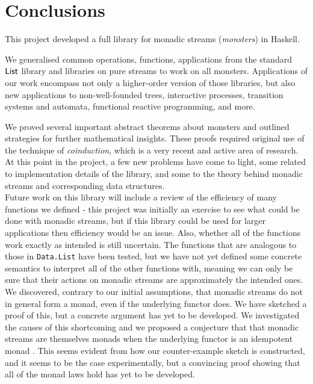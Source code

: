 \section{Conclusions}

This project developed a full library for monadic streams ({\em monsters}) in Haskell.

We generalised common operations, functions, applications from the standard $\mathsf{List}$ library and libraries on pure streams to work on all monsters.
Applications of our work encompass not only a higher-order version of those libraries, but also new applications to non-well-founded trees, interactive processes, transition systems and automata, functional reactive programming, and more.

We proved several important abstract theorems about monsters and outlined strategies for further mathematical insights.
These proofs required original use of the technique of {\em coinduction}, which is a very recent and active area of research. \\

At this point in the project, a few new problems have come to light, some related to implementation details of the library, and some to the theory behind monadic streams and corresponding data structures. \\

Future work on this library will include a review of the efficiency of many functions we defined - this project was initially an exercise to see what could be done with monadic streams, but if this library could be used for larger applications then efficiency would be an issue. Also, whether all of the functions work exactly as intended is still uncertain. The functions that are analogous to those in \verb+Data.List+ have been tested, but we have not yet defined some concrete semantics to interpret all of the other functions with, meaning we can only be sure that their actions on monadic streams are approximately the intended ones. \\

We discovered, contrary to our initial assumptions, that monadic streams do not in general form a monad, even if the underlying functor does. We have sketched a proof of this, but a concrete argument has yet to be developed.
We investigated the causes of this shortcoming and we proposed a conjecture that
that monadic streams are themselves monads when the underlying functor is an idempotent monad \cite{idempotent_monads}. This seems evident from how our counter-example sketch is constructed, and it seems to be the case experimentally, but a convincing proof showing that all of the monad laws hold has yet to be developed. 

